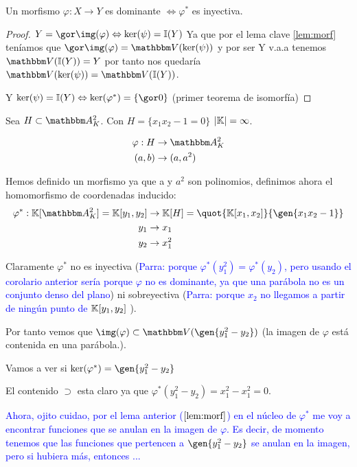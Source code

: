 \begin{corol} \label{crl:morf}
	Un morfismo $\varphi: X \rightarrow Y$ es dominante $\Leftrightarrow \varphi^*$ es inyectiva.
\end{corol}

\begin{proof}
	$Y=\cls{\img(\varphi)} \Leftrightarrow \ker(\psi)=\I(Y)$
	Ya que por el lema clave \ref{lem:morf} teníamos que $\cls{\img(\varphi)}=\V(\ker(\psi))$ y por ser Y v.a.a tenemos $\V(\I(Y))=Y$ por tanto nos quedaría $\V(\ker(\psi))=\V(\I(Y))$.

	Y $\ker(\psi)=\I(Y) \Leftrightarrow \ker(\varphi^*)=\{\cls{0}\}$ (primer teorema de isomorfía)
\end{proof}

\begin{example}
	Sea $H \subset  \A^2_K$. Con $H=\{x_1x_2-1=0\}$ $|\mathbb{K}|=\infty$.

	\begin{align*}
		\varphi: H & \rightarrow \A^2_K \\
		(a,b) & \rightarrow (a,a^2)
	\end{align*}


	Hemos definido un morfismo ya que a y $a^2$ son polinomios, definimos ahora el homomorfismo de coordenadas inducido:
	\begin{align*}
		\varphi^*: \K[\A^2_K]=\K[y_1,y_2] & \rightarrow \K[H]=\quot{\K[x_1,x_2]}{\gen{x_1x_2-1}} \\
		y_1 & \rightarrow x_1 \\
		y_2 & \rightarrow x_1^2
	\end{align*}

	Claramente $\varphi^*$ no es inyectiva (\textcolor{blue}{Parra: porque $\varphi^*(y_1^2)=\varphi^*(y_2)$, pero usando el corolario anterior sería porque $\varphi$ no es dominante, ya que una parábola no es un conjunto denso del plano}) ni sobreyectiva (\textcolor{blue}{Parra: porque $x_2$ no llegamos a partir de ningún punto de $\mathbb{K}[y_1,y_2]$} ).

    Por tanto vemos que $\img(\varphi) \subset \V(\gen{y_1^2-y_2})$ (la imagen de $\varphi$ está contenida en una parábola.).

    Vamos a ver si $\ker(\varphi^*)=\gen{y_1^2-y_2}$

	El contenido $\supset$ esta claro ya que $\varphi^*(y_1^2-y_2)=x_1^2-x_1^2=0$.

	\textcolor{blue}{Ahora, ojito cuidao, por el lema anterior ($\ref{lem:morf}$) en el núcleo de $\varphi^*$ me voy a encontrar funciones que se anulan en la imagen de $\varphi$. Es decir, de momento tenemos que las funciones que pertencen a $\gen{y_1^2-y_2}$ se anulan en la imagen, pero si hubiera más, entonces ...}


\end{example}

